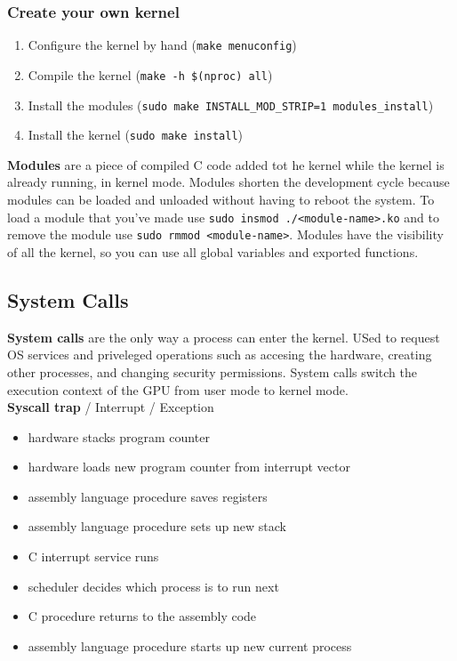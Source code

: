\documentclass{article}
\begin{document}
    \subsubsection{Create your own kernel}

    \begin{enumerate}
    \item Configure the kernel by hand (\texttt{make menuconfig})
    \item Compile the kernel (\texttt{make -h \$(nproc) all})
    \item Install the modules (\texttt{sudo make INSTALL\_MOD\_STRIP=1 modules\_install})
    \item Install the kernel (\texttt{sudo make install})
    \end{enumerate}
    
    \textbf{Modules} are a piece of compiled C code added tot he kernel while the kernel is already running, in kernel mode. Modules shorten the development cycle because modules can be loaded and unloaded without having to reboot the system. To load a module that you've made use \texttt{sudo insmod ./<module-name>.ko} and to remove the module use \texttt{sudo rmmod <module-name>}. Modules have the visibility of all the kernel, so you can use all global variables and exported functions. 

\subsection{System Calls}

    \textbf{System calls} are the only way a process can enter the kernel. USed to request OS services and priveleged operations such as accesing the hardware, creating other processes, and changing security permissions. System calls switch the execution context of the GPU from user mode to kernel mode. \\

    \noindent \textbf{Syscall trap} / Interrupt / Exception

    \begin{itemize}
    \item hardware stacks program counter
    \item hardware loads new program counter from interrupt vector
    \item assembly language procedure saves registers
    \item assembly language procedure sets up new stack
    \item C interrupt service runs
    \item scheduler decides which process is to run next
    \item C procedure returns to the assembly code
    \item assembly language procedure starts up new current process
    \end{itemize}
\end{document}
